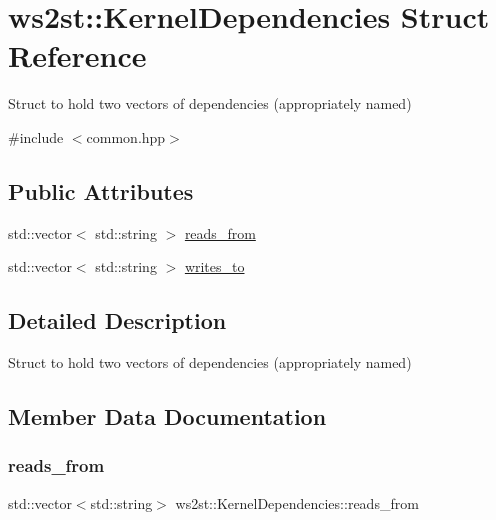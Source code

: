 \hypertarget{structws2st_1_1KernelDependencies}{}\section{ws2st\+:\+:Kernel\+Dependencies Struct Reference}
\label{structws2st_1_1KernelDependencies}


Struct to hold two vectors of dependencies (appropriately named)  




{\ttfamily \#include $<$common.\+hpp$>$}

\subsection*{Public Attributes}
\begin{DoxyCompactItemize}
\item 
std\+::vector$<$ std\+::string $>$ \mbox{\hyperlink{structws2st_1_1KernelDependencies_a4385ba2e56f0d9b63772480b2c3da15d}{reads\+\_\+from}}
\item 
std\+::vector$<$ std\+::string $>$ \mbox{\hyperlink{structws2st_1_1KernelDependencies_a85a9ccadcb7d6912675a21cf500a4ef1}{writes\+\_\+to}}
\end{DoxyCompactItemize}


\subsection{Detailed Description}
Struct to hold two vectors of dependencies (appropriately named) 

\subsection{Member Data Documentation}
\mbox{\label{structws2st_1_1KernelDependencies_a4385ba2e56f0d9b63772480b2c3da15d}} 
\subsubsection{\texorpdfstring{reads\+\_\+from}{reads\_from}}
{\footnotesize\ttfamily std\+::vector$<$std\+::string$>$ ws2st\+::\+Kernel\+Dependencies\+::reads\+\_\+from}

